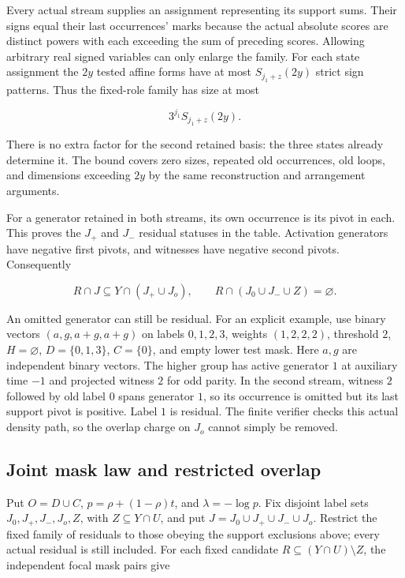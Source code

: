 \documentclass[11pt]{article}
\begin{document}
Every actual stream supplies an assignment representing its support sums. Their signs equal their last occurrences' marks because the actual absolute scores are distinct powers with each exceeding the sum of preceding scores. Allowing arbitrary real signed variables can only enlarge the family. For each state assignment the \(2y\) tested affine forms have at most \(S_{j_1+z}(2y)\) strict sign patterns. Thus the fixed-role family has size at most

\[3^{j_1}S_{j_1+z}(2y).\]

There is no extra factor for the second retained basis: the three states already determine it. The bound covers zero sizes, repeated old occurrences, old loops, and dimensions exceeding \(2y\) by the same reconstruction and arrangement arguments.

For a generator retained in both streams, its own occurrence is its pivot in each. This proves the \(J_+\) and \(J_-\) residual statuses in the table. Activation generators have negative first pivots, and witnesses have negative second pivots. Consequently

\[R\cap J\subseteq Y\cap(J_+\cup J_o),\qquad
R\cap(J_0\cup J_-\cup Z)=\varnothing.\]

An omitted generator can still be residual. For an explicit example, use binary vectors \((a,g,a+g,a+g)\) on labels \(0,1,2,3\), weights \((1,2,2,2)\), threshold \(2\), \(H=\varnothing\), \(D=\{0,1,3\}\), \(C=\{0\}\), and empty lower test mask. Here \(a,g\) are independent binary vectors. The higher group has active generator \(1\) at auxiliary time \(-1\) and projected witness \(2\) for odd parity. In the second stream, witness \(2\) followed by old label \(0\) spans generator \(1\), so its occurrence is omitted but its last support pivot is positive. Label \(1\) is residual. The finite verifier checks this actual density path, so the overlap charge on \(J_o\) cannot simply be removed.

\subsection{Joint mask law and restricted overlap}\label{joint-mask-law-and-restricted-overlap}

Put \(O=D\cup C\), \(p=\rho+(1-\rho)t\), and \(\lambda=-\log p\). Fix disjoint label sets \(J_0,J_+,J_-,J_o,Z\), with \(Z\subseteq Y\cap U\), and put \(J=J_0\cup J_+\cup J_-\cup J_o\). Restrict the fixed family of residuals to those obeying the support exclusions above; every actual residual is still included. For each fixed candidate \(R\subseteq(Y\cap U)\setminus Z\), the independent focal mask pairs give
\end{document}
